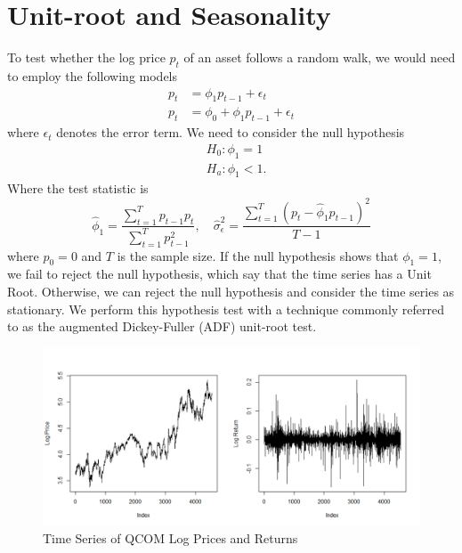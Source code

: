 \section{Unit-root and Seasonality}
To test whether the log price $p_t$ of an asset follows a random walk, we would need to employ the following models
\begin{equation}
	\begin{aligned}
		p_t&=\phi_1p_{t-1}+\epsilon_t\\
		p_t&=\phi_0+\phi_1p_{t-1}+\epsilon_t
	\end{aligned}
\end{equation}
where $\epsilon_t$ denotes the error term. We need to consider the null hypothesis
\begin{equation}
	\begin{aligned}
		&H_0:\phi_1=1\\
		&H_a:\phi_1<1.
	\end{aligned}
\end{equation}
Where the test statistic is
\begin{equation}
	\hat{\phi}_1=\frac{\sum_{t=1}^{T}p_{t-1}p_t}{\sum_{t=1}^{T}p^{2}_{t-1}},\quad\hat{\sigma}^2_\epsilon=\frac{\sum_{t=1}^{T}(p_t-\hat{\phi}_1p_{t-1})^2}{T-1}
\end{equation}
where $p_0=0$ and $T$ is the sample size. If the null hypothesis shows that $\phi_1=1$, we fail to reject the null hypothesis, which say that the time series has a Unit Root. Otherwise, we can reject the null hypothesis and consider the time series as stationary. We perform this hypothesis test with a technique commonly referred to as the augmented Dickey-Fuller (ADF) unit-root test.

\begin{figure}[h]
	\centering
	\includegraphics[width=0.9\linewidth]{content/plots/qcom_log_price_return.png}
	\caption{Time Series of QCOM Log Prices and Returns }
	\label{fig:qcom_log_price}
\end{figure}

